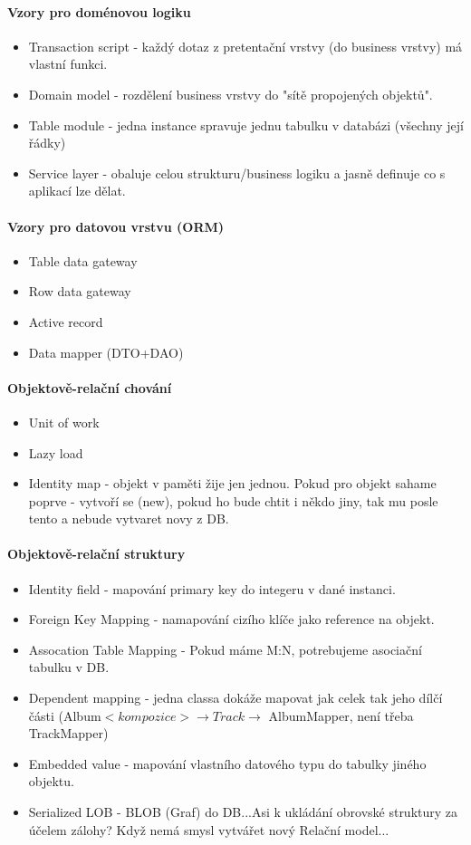 \documentclass[10pt,a4paper]{article}
\begin{document}
\paragraph{Vzory pro doménovou logiku}
\begin{itemize}
\item Transaction script - každý dotaz z pretentační vrstvy (do business vrstvy) má vlastní funkci.
\item Domain model - rozdělení business vrstvy do "sítě propojených objektů".
\item Table module - jedna instance spravuje jednu tabulku v databázi (všechny její řádky)
\item Service layer - obaluje celou strukturu/business logiku a jasně definuje co s aplikací lze dělat.
\end{itemize}
\paragraph{Vzory pro datovou vrstvu (ORM)}
\begin{itemize}
\item Table data gateway
\item Row data gateway
\item Active record
\item Data mapper (DTO+DAO)
\end{itemize}
\paragraph{Objektově-relační chování}
\begin{itemize}
\item Unit of work
\item Lazy load
\item Identity map - objekt v paměti žije jen jednou. Pokud pro objekt sahame poprve - vytvoří se (new), pokud ho bude chtit i někdo jiny, tak mu posle tento a nebude vytvaret novy z DB.
\end{itemize}
\paragraph{Objektově-relační struktury}
\begin{itemize}
\item Identity field - mapování primary key do integeru v dané instanci.
\item Foreign Key Mapping - namapování cizího klíče jako reference na objekt.
\item Assocation Table Mapping - Pokud máme M:N, potrebujeme asociační tabulku v DB.
\item Dependent mapping - jedna classa dokáže mapovat jak celek tak jeho dílčí části (Album$<kompozice>\rightarrow Track \rightarrow$ AlbumMapper, není třeba TrackMapper)
\item Embedded value - mapování vlastního datového typu do tabulky jiného objektu.
\item Serialized LOB - BLOB (Graf) do DB...Asi k ukládání obrovské struktury za účelem zálohy? Když nemá smysl vytvářet nový Relační model...
\end{itemize}
\end{document}
